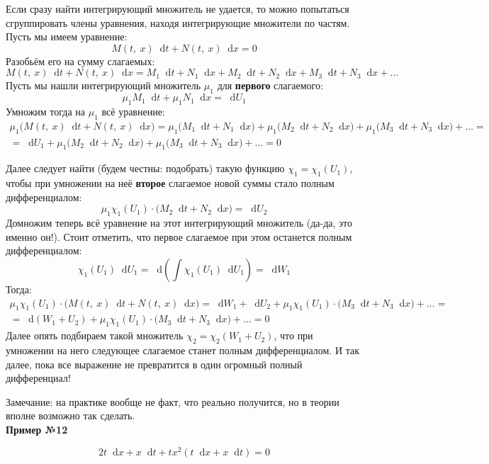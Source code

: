\documentclass[a4paper,12pt]{article}
\renewcommand*\d{\mathop{}\!\mathrm{d}}
\newcommand{\ds}{\displaystyle}
\begin{document}
Если сразу найти интегрирующий множитель не удается, то можно попытаться сгруппировать члены уравнения, находя интегрирующие множители по частям. Пусть мы имеем уравнение:
\[M(t,\ x)\d t + N(t,\ x)\d x = 0\]
Разобьём его на сумму слагаемых:
\[M(t,\ x)\d t + N(t,\ x)\d x = M_1\d t + N_1\d x + M_2\d t + N_2\d x + M_3\d t + N_3\d x + \ldots\]
Пусть мы нашли интегрирующий множитель $\mu_1$ для \textbf{первого} слагаемого:
\[\mu_1M_1\d t + \mu_1N_1\d x = \d U_1\]
Умножим тогда на $\mu_1$ всё уравнение:
\begin{gather*}
\mu_1\big(M(t,\ x)\d t + N(t,\ x)\d x\big) = \mu_1\big(M_1\d t + N_1\d x\big) + \mu_1\big(M_2\d t + N_2\d x\big) + \mu_1\big(M_3\d t + N_3\d x\big) + \ldots = \\
= \d U_1 + \mu_1\big(M_2\d t + N_2\d x\big) + \mu_1\big(M_3\d t + N_3\d x\big) + \ldots = 0
\end{gather*}

Далее следует найти (будем честны: подобрать) такую функцию $\chi_1 = \chi_1(U_1)$, чтобы при умножении на неё \textbf{второе} слагаемое новой суммы стало полным дифференциалом:
\[\mu_1\chi_1(U_1)\cdot\big(M_2\d t + N_2\d x\big) = \d U_2\]
Домножим теперь всё уравнение на этот интегрирующий множитель (да-да, это именно он!). Стоит отметить, что первое слагаемое при этом останется полным дифференциалом:
\[\chi_1(U_1)\d U_1 = \d\left(\ds\int \chi_1(U_1)\d U_1\right) = \d W_1\]
Тогда:
\begin{gather*}
\mu_1\chi_1(U_1)\cdot \big(M(t,\ x)\d t + N(t,\ x)\d x\big) = \d W_1 + \d U_2 + \mu_1\chi_1(U_1)\cdot \big(M_3\d t + N_3\d x\big) + \ldots = \\
= \d(W_1 + U_2) + \mu_1\chi_1(U_1)\cdot \big(M_3\d t + N_3\d x\big) + \ldots = 0
\end{gather*}
Далее опять подбираем такой множитель $\chi_2 = \chi_2(W_1 + U_2)$, что при умножении на него следующее слагаемое станет полным дифференциалом. И так далее, пока все выражение не превратится в один огромный полный дифференциал!

Замечание: на практике вообще не факт, что реально получится, но в теории вполне возможно так сделать.
\ \\

\textbf{Пример №12}

\[2t\d x + x\d t + tx^2(t\d x + x\d t) = 0\]
\end{document}
